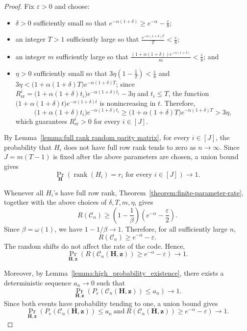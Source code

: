 \documentclass[journal,letterpaper,onecolumn,11pt]{IEEEtran}
\newcommand{\cC}{\mathcal{C}}
\newcommand{\boldz}{\mathbf{z}}
\newcommand{\boldH}{\mathbf{H}}
\begin{document}
\begin{proof}
Fix \(\varepsilon>0\) and choose:
\begin{itemize}
    \item \(\delta>0\) sufficiently small so that
    \(e^{-\alpha(1+\delta)}\geq e^{-\alpha}-\frac{\varepsilon}{8}\);
    \item an integer \(T>1\) sufficiently large so that
    \(\frac{e^{-\alpha(1+\delta)T}}{T}<\frac{\varepsilon}{8}\);
    \item an integer \(m\) sufficiently large so that
    \(\frac{(1+\alpha(1+\delta))e^{-\alpha(1+\delta)}}{m}
    <\frac{\varepsilon}{8}\); and
    \item \(\eta>0\) sufficiently small so that
    \(3\eta\left(1-\frac{1}{T}\right)<\frac{\varepsilon}{8}\)
    and
    $
    3\eta<
    \bigl(1+\alpha(1+\delta)T\bigr)
    e^{-\alpha(1+\delta)T}$; 
    since
    \(R_{\mathrm{er}}^i=
    \bigl(1+\alpha(1+\delta)t_i\bigr)
    e^{-\alpha(1+\delta)t_i}-3\eta\)
    and \(t_i\leq T\), the function
    \(\bigl(1+\alpha(1+\delta)t\bigr)e^{-\alpha(1+\delta)t}\)
    is nonincreasing in \(t\). Therefore,
    \[
    \bigl(1+\alpha(1+\delta)t_i\bigr)
    e^{-\alpha(1+\delta)t_i}
    \geq
    \bigl(1+\alpha(1+\delta)T\bigr)
    e^{-\alpha(1+\delta)T}
    >
    3\eta,
    \]
    which guarantees \(R_{\mathrm{er}}^i>0\) for every \(i\in[J]\).
\end{itemize}


By Lemma~\ref{lemma:full rank random parity matrix}, for every
\(i\in[J]\), the probability that \(H_i\) does not have full row rank
tends to zero as \(n\to\infty\).
Since \(J=m(T-1)\) is fixed after the
above parameters are chosen, a union bound gives
\[
\Pr_{\boldH}\left(
\operatorname{rank}(H_i)=r_i
\text{ for every }i\in[J]
\right)
\to1.
\]

Whenever all \(H_i\)'s have full row rank,
Theorem~\ref{theorem:finite-parameter-rate}, together with the above
choices of \(\delta,T,m,\eta\), gives
\[
R(\cC_n)
\geq
\left(1-\frac{1}{\beta}\right)
\left(e^{-\alpha}-\frac{\varepsilon}{2}\right).
\]
Since \(\beta=\omega(1)\), we have \(1-1/\beta\to1\). Therefore, for
all sufficiently large \(n\),
\[
R(\cC_n)\geq e^{-\alpha}-\varepsilon.
\]
The random shifts do not affect the rate of the code. Hence,
\[
\Pr_{\boldH,\boldz}\left(
R(\cC_n(\boldH,\boldz))
\geq e^{-\alpha}-\varepsilon
\right)
\to1.
\]

Moreover, by Lemma~\ref{lemma:high_probability_existence}, there exists
a deterministic sequence \(a_n\to0\) such that
\[
\Pr_{\boldH,\boldz}\left(
P_e(\cC_n(\boldH,\boldz))\leq a_n
\right)
\to1.
\]
Since both events have probability tending to one, a union bound gives
\begin{equation}\label{eq:event}
    \Pr_{\boldH,\boldz}\left(
P_e(\cC_n(\boldH,\boldz))\leq a_n
\ \text{and}\
R(\cC_n(\boldH,\boldz))
\geq e^{-\alpha}-\varepsilon
\right)
\to1.
\end{equation}




\end{proof}
\end{document}
